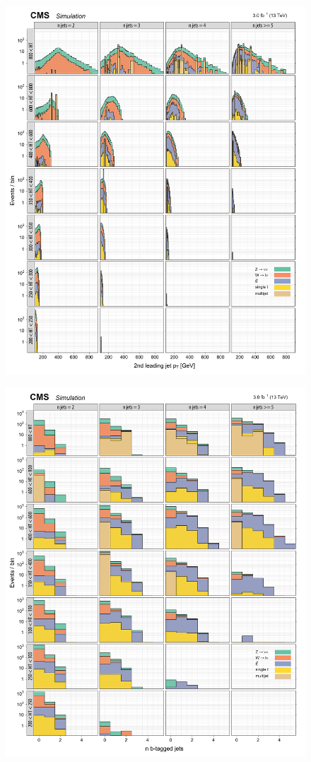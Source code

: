 \begin{figure}[!h]
\centering
\includegraphics[scale=0.95]{figures/kiplots/c150107_s150318_f015_jet_pt_1_100}
\end{figure}

\begin{figure}[!h]
\centering
\includegraphics[scale=0.95]{figures/kiplots/c150107_s150318_f015_nbjets_100}
\end{figure}

